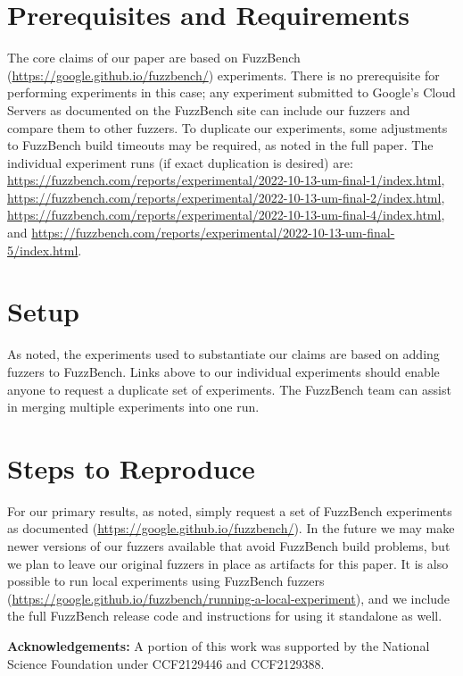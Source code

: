 \documentclass[manuscript,screen,review]{acmart}
\begin{document}
\section{Prerequisites and Requirements}


The core claims of our paper are based on FuzzBench
\cite{metzman2021fuzzbench}
(\url{https://google.github.io/fuzzbench/}) experiments.  There is no
prerequisite for performing experiments in this case; any experiment
submitted to Google's Cloud Servers as documented on the FuzzBench site
can include our fuzzers and compare them to other fuzzers.
To duplicate our experiments, some adjustments to FuzzBench build
timeouts may be required, as noted in the full paper.  The individual experiment
runs (if exact duplication is desired) are: \url{https://fuzzbench.com/reports/experimental/2022-10-13-um-final-1/index.html}, \url{https://fuzzbench.com/reports/experimental/2022-10-13-um-final-2/index.html}, \url{https://fuzzbench.com/reports/experimental/2022-10-13-um-final-4/index.html}, and \url{https://fuzzbench.com/reports/experimental/2022-10-13-um-final-5/index.html}.

\section{Setup}

As noted, the experiments used to substantiate our claims are based on
adding fuzzers to FuzzBench.  Links above to our individual
experiments should enable anyone to request a duplicate set of
experiments.  The FuzzBench team can assist in merging multiple
experiments into one run.

\section{Steps to Reproduce}

For our primary results, as noted, simply request a set of FuzzBench
experiments as documented
(\url{https://google.github.io/fuzzbench/}).  In the future we may
make newer versions of our fuzzers available that avoid FuzzBench
build problems, but we plan to leave our original fuzzers in place as
artifacts for this paper.  It is also possible to run local
experiments using FuzzBench fuzzers
(\url{https://google.github.io/fuzzbench/running-a-local-experiment}),
and we include the full FuzzBench release code and instructions for
using it standalone as well.

\begin{sloppypar}
\textbf{Acknowledgements:} A portion of this work was supported by the National Science Foundation under CCF2129446 and CCF2129388.
\end{sloppypar}




\end{document}
